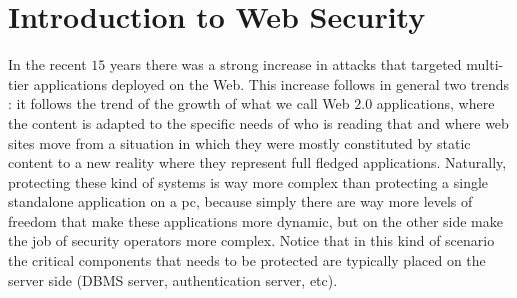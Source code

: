 \section{Introduction to Web Security}
In the recent $15$ years there was a strong increase in attacks that targeted multi-tier applications deployed on the Web. This increase follows in general two trends : it follows the trend of the growth of what we call Web $2.0$ applications, where the content is adapted to the specific needs of who is reading that and where web sites move from a situation in which they were mostly constituted by static content to a new reality where they represent full fledged applications. Naturally, protecting these kind of systems is way more complex than protecting a single standalone application on a pc, because simply there are way more levels of freedom that make these applications more dynamic, but on the other side make the job of security operators more complex. Notice that in this kind of scenario the critical components that needs to be protected are typically placed on the server side (DBMS server, authentication server, etc).

